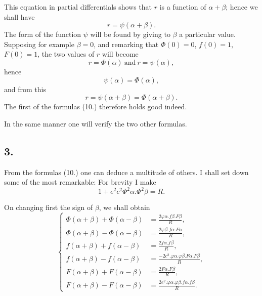 \documentclass{article}
\begin{document}
This equation in partial differentials shows that $r$ is a function of $\alpha+\beta$; hence we shall have
\[ r=\psi(\alpha+\beta). \]
The form of the function $\psi$ will be found by giving to $\beta$ a particular value. Supposing for example $\beta=0$, and remarking that $\Phi(0)=0$, $f(0)=1$, $F(0)=1$, the two values of $r$ will become
\[ r=\Phi(\alpha)\ \text{and}\ r=\psi(\alpha), \]
hence
\[ \psi(\alpha)=\Phi(\alpha), \]
and from this
\[ r=\psi(\alpha+\beta)=\Phi(\alpha+\beta). \]
The first of the formulas (10.) therefore holds good indeed.

In the same manner one will verify the two other formulas.


\subsection*{3.}

From the formulas (10.) one can deduce a multitude of others. I shall set down some of the most remarkable: For brevity I make
\[ 1+e^{2}c^{2}\Phi^{2}\alpha.\Phi^{2}\beta=R. \tag{11.} \]

On changing first the sign of $\beta$, we shall obtain
\[ \left\{\begin{aligned} \Phi(\alpha+\beta)+\Phi(\alpha-\beta)&=\frac{2\varphi\alpha.f\beta.F\beta}{R},\\ \Phi(\alpha+\beta)-\Phi(\alpha-\beta)&=\frac{2\varphi\beta.f\alpha.F\alpha}{R},\\ f(\alpha+\beta)+f(\alpha-\beta)&=\frac{2f\alpha.f\beta}{R},\\ f(\alpha+\beta)-f(\alpha-\beta)&=\frac{-2c^{2}.\varphi\alpha.\varphi\beta.F\alpha.F\beta}{R},\\ F(\alpha+\beta)+F(\alpha-\beta)&=\frac{2F\alpha.F\beta}{R},\\ F(\alpha+\beta)-F(\alpha-\beta)&=\frac{2e^{2}.\varphi\alpha.\varphi\beta.f\alpha.f\beta}{R}. \end{aligned}\right. \tag{12.} \]
\end{document}
